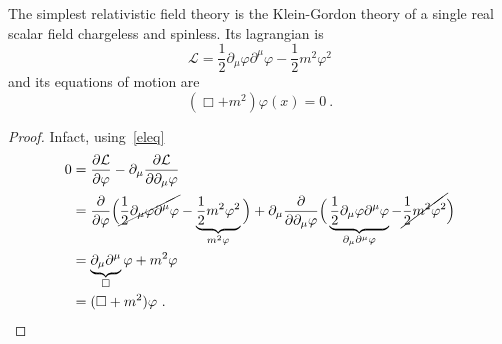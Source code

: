     The simplest relativistic field theory is the Klein-Gordon theory of a single real scalar field chargeless and spinless. Its lagrangian is 
    \begin{equation*}
        \mathcal L = \frac{1}{2} \partial_\mu \varphi \partial^\mu \varphi - \frac{1}{2} m^2 \varphi^2 
    \end{equation*}
    and its equations of motion are 
    \begin{equation}\label{kgeq}
        (\Box + m^2) \varphi(x) = 0 ~.
    \end{equation}
    \begin{proof}
        Infact, using~\eqref{eleq} 
        \begin{equation*}
        \begin{aligned}
            0 & = \frac{\partial\mathcal L}{\partial\varphi} - \partial_\mu \frac{\partial\mathcal L}{\partial\partial_\mu \varphi} \\ & = \frac{\partial}{\partial\varphi} \Big ( \cancel{\frac{1}{2} \partial_\mu \varphi \partial^\mu \varphi} - \underbrace{\frac{1}{2} m^2 \varphi^2}_{m^2 \varphi} \Big) + \partial_\mu \frac{\partial}{\partial\partial_\mu \varphi} \Big ( \underbrace{\frac{1}{2} \partial_\mu \varphi \partial^\mu \varphi}_{\partial_\mu \partial^\mu \varphi} - \cancel{\frac{1}{2} m^2 \varphi^2} \Big) \\ & = \underbrace{\partial_\mu \partial^\mu}_\Box \varphi + m^2 \varphi \\ & = (\Box + m^2) \varphi ~.
        \end{aligned}
        \end{equation*}
    \end{proof}

